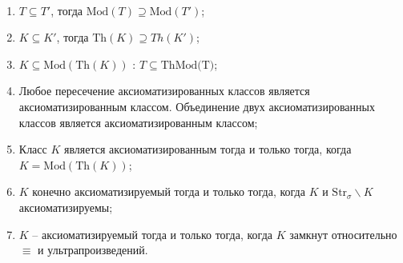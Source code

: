 \begin{prop} \ 

    \begin{enumerate}
        \item $T \subseteq T'$, тогда $\text{Mod}(T) \supseteq \text{Mod}(T')$; 
        \item $K \subseteq K'$, тогда $\text{Th}(K) \supseteq Th(K')$; 
        \item $K \subseteq \text{Mod}(\text{Th}(K))$ : $T \subseteq \text{Th}{\text{Mod(T)}}$; 
        \item Любое пересечение аксиоматизированных классов является аксиоматизированным классом. Объединение двух аксиоматизированных классов является аксиоматизированным классом; 
        \item Класс $K$ является аксиоматизированным тогда и только тогда, когда $K = \text{Mod}(\text{Th}(K))$; 
        \item $K$ конечно аксиоматизируемый тогда и только тогда, когда $K$ и $\text{Str}_\sigma \backslash K$ аксиоматизируемы; 
        \item $K$ -- аксиоматизируемый тогда и только тогда, когда $K$ замкнут относительно $\equiv$ и ультрапроизведений.
    \end{enumerate}
\end{prop}


